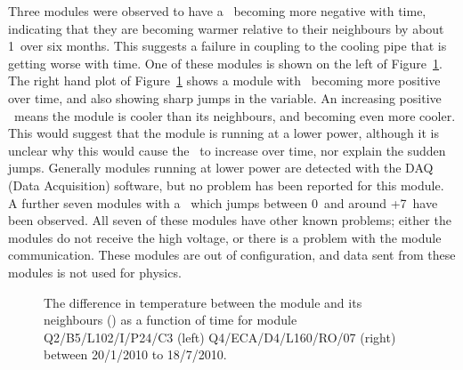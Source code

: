 Three modules were observed to have a \tdiff\ becoming more negative with time,
indicating that they are becoming warmer relative to their neighbours by about
1\dc\  over six months. This suggests a failure in coupling to the cooling pipe
that is getting worse with time. One of these modules is shown on the left of
Figure~\ref{fig:pm_ev_tdiff}.  The right hand plot of
Figure~\ref{fig:pm_ev_tdiff} shows a module with \tdiff\ becoming more positive
over time, and also showing sharp jumps in the variable. An increasing positive
\tdiff\ means the module is cooler than its neighbours, and becoming even more
cooler. This would suggest that the module is running at a lower power, although
it is unclear why this would cause the \tdiff\ to increase over time, nor explain
the sudden jumps. Generally modules running at lower power are detected with the
DAQ (Data Acquisition) software, but no problem has been reported for this
module. A further seven modules with a \tdiff\ which jumps between 0\dc\ and
around +7\dc\ have been observed.  All seven of these modules have other known
problems; either the modules do not receive the high voltage, or there is a
problem with the module communication. These modules are out of configuration,
and data sent from these modules is not used for physics.

\begin{figure}[h]
 	\centering
	\caption{The difference in temperature between the module and its neighbours (\tdiff) as a function of time for module Q2/B5/L102/I/P24/C3 (left) Q4/ECA/D4/L160/RO/07 (right) between 20/1/2010 to 18/7/2010. }
	\label{fig:pm_ev_tdiff}
\end{figure}

